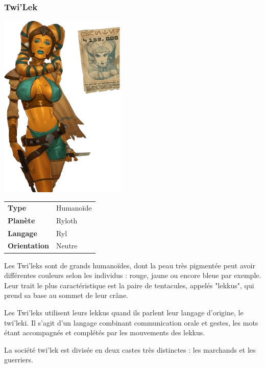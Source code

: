 \subsubsection{Twi’Lek}
\begin{samepage}
	\vspace{-1\baselineskip}
	\includegraphics[width=6cm]{img/personnages/races/twilek.png}
	\vspace{-5\baselineskip}
	\begin{flushright}
		\begin{tabular}{ l l }
			\textbf{Type} 			& Humanoïde \\
		   	\textbf{Planète} 		& Ryloth \\
		   	\textbf{Langage} 		& Ryl \\
		   	\textbf{Orientation} 	& Neutre \\
		\end{tabular}
	\end{flushright}
\end{samepage}

Les Twi’leks sont de grands humanoïdes, dont la peau très pigmentée peut avoir différentes couleurs selon les individus : rouge, jaune ou encore bleue par exemple. Leur trait le plus caractéristique est la paire de tentacules, appelés "lekkus", qui prend sa base au sommet de leur crâne.

Les Twi’leks utilisent leurs lekkus quand ils parlent leur langage d’origine, le twi’leki. Il s’agit d’un langage combinant communication orale et gestes, les mots étant accompagnés et complétés par les mouvements des lekkus.

La société twi’lek est divisée en deux castes très distinctes : les marchands et les guerriers.

